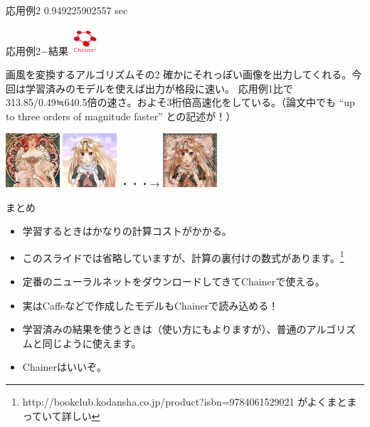 \documentclass[12pt, unicode]{beamer}
\begin{document}
\begin{frame}[fragile]{応用例2}
\Large{0.949225902557 sec}
\end{frame}

\begin{frame}{応用例2−結果}
\includegraphics[clip,width=1.0cm]{image/chainer_logo.png}
\begin{block}{画風を変換するアルゴリズムその2}
確かにそれっぽい画像を出力してくれる。今回は学習済みのモデルを使えば出力が格段に速い。
応用例1比で313.85/0.49≒640.5倍の速さ。およそ3桁倍高速化をしている。（論文中でも ``up to three orders of magnitude faster'' との記述が！）
\end{block}
\includegraphics[clip,width=2.0cm]{image/style_6.png}
\includegraphics[clip,width=2.0cm]{image/yuudachi_400x400.png}
・・・→
\includegraphics[clip,width=2.0cm]{image/yuudachi_style6.jpg}
\end{frame}

\begin{frame}{まとめ}
\begin{block}{}
\begin{itemize}
\item 学習するときはかなりの計算コストがかかる。
\item このスライドでは省略していますが、計算の裏付けの数式があります。\footnote[frame]{http://bookclub.kodansha.co.jp/product?isbn=9784061529021 がよくまとまっていて詳しい}
\item 定番のニューラルネットをダウンロードしてきてChainerで使える。
\item 実はCaffeなどで作成したモデルもChainerで読み込める！
\item 学習済みの結果を使うときは（使い方にもよりますが）、普通のアルゴリズムと同じように使えます。
\item Chainerはいいぞ。
\end{itemize}
\end{block}
\end{frame}
\end{document}
